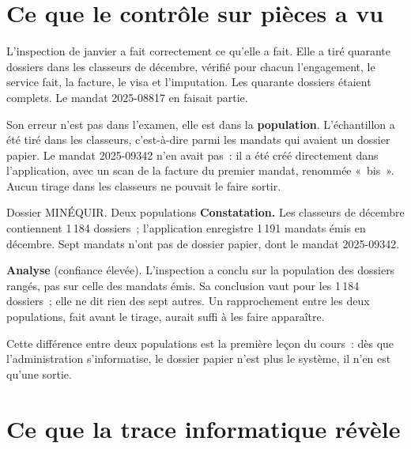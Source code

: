\separateur

\section{Ce que le contrôle sur pièces a vu}
\label{sec:pro-pieces}

L'inspection de janvier a fait correctement ce qu'elle a fait. Elle a tiré
quarante dossiers dans les classeurs de décembre, vérifié pour chacun
l'engagement, le service fait, la facture, le visa et l'imputation. Les
quarante dossiers étaient complets. Le mandat 2025-08817 en faisait partie.

Son erreur n'est pas dans l'examen, elle est dans la \textbf{population}.
L'échantillon a été tiré dans les classeurs, c'est-à-dire parmi les
mandats qui avaient un dossier papier. Le mandat 2025-09342 n'en avait pas~:
il a été créé directement dans l'application, avec un scan de la facture du
premier mandat, renommée «~bis~». Aucun tirage dans les classeurs ne
pouvait le faire sortir.

\begin{boxscenario}{Dossier MINÉQUIR. Deux populations}
\textbf{Constatation.} Les classeurs de décembre contiennent 1\,184
dossiers~; l'application enregistre 1\,191 mandats émis en décembre. Sept
mandats n'ont pas de dossier papier, dont le mandat 2025-09342.

\medskip
\textbf{Analyse} (confiance élevée). L'inspection a conclu sur la
population des dossiers rangés, pas sur celle des mandats émis. Sa
conclusion vaut pour les 1\,184 dossiers~; elle ne dit rien des sept
autres. Un rapprochement entre les deux populations, fait avant le tirage,
aurait suffi à les faire apparaître.
\end{boxscenario}

Cette différence entre deux populations est la première leçon du
cours~: dès que l'administration s'informatise, le dossier papier n'est
plus le système, il n'en est qu'une sortie.

\separateur

\section{Ce que la trace informatique révèle}
\label{sec:pro-trace}

